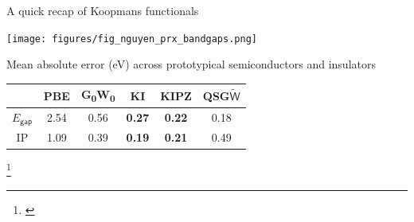 \documentclass[xcolor=table,aspectratio=169]{beamer}
\newcommand\blfootcite[1]{%
  \begingroup
  \renewcommand\thefootnote{}\footnote{\hspace{-4ex}\cite{#1}}%
  \addtocounter{footnote}{-1}%
  \endgroup
}
\numberwithin{equation}{section}
\begin{document}
\begin{frame}{A quick recap of Koopmans functionals}
   \begin{minipage}[c]{0.35\textwidth}
      \texttt{[image: figures/fig\_nguyen\_prx\_bandgaps.png]}
   \end{minipage}
   \hspace{1em}
   \begin{minipage}[c]{0.6\textwidth}

      \footnotesize
      Mean absolute error (eV) across prototypical semiconductors and insulators

      \vspace{1ex}
      \footnotesize
      \begin{tabular}{c S[table-format = 2.2] S[table-format = 2.2] >{\color{linh_blue}\bfseries}S[table-format = 2.2] >{\color{linh_pink}\bfseries}S[table-format = 2.2] S[table-format = 2.2]}
                          & {PBE} & {G\textsubscript{0}W\textsubscript{0}} & {KI} & {KIPZ} & {QSG$\tilde{\mathsf{W}}$} \\
         \midrule
         \midrule
         $E_\mathsf{gap}$ & 2.54  & 0.56                                   & 0.27 & 0.22   & 0.18                      \\
         \midrule
         IP               & 1.09  & 0.39                                   & 0.19 & 0.21   & 0.49                      \\
      \end{tabular}
   \end{minipage}

   \blfootcite{Nguyen2018}
\end{frame}
\end{document}
